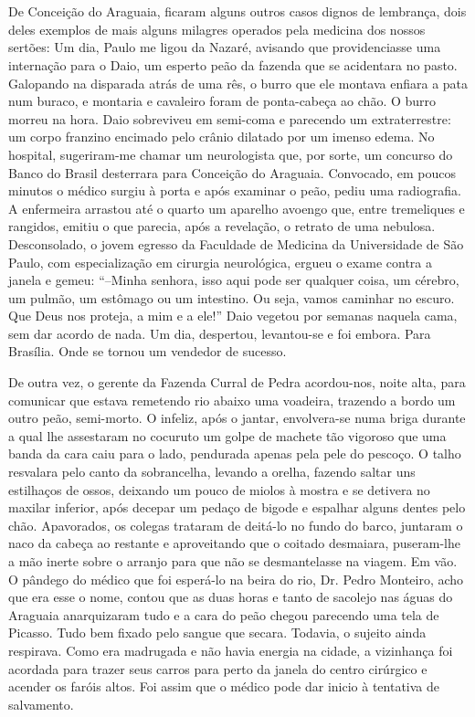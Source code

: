 \chapter{}
De Conceição do Araguaia, ficaram alguns outros casos dignos de lembrança, dois deles exemplos de mais alguns milagres operados pela medicina dos nossos sertões: 
Um dia, Paulo me ligou da Nazaré, avisando que providenciasse uma internação para o Daio, um esperto peão da fazenda que se acidentara no pasto.
Galopando na disparada atrás de uma rês, o burro que ele montava enfiara a pata num buraco, e montaria e cavaleiro foram de ponta-cabeça ao chão.
O burro morreu na hora.
Daio sobreviveu em semi-coma e parecendo um extraterrestre: um corpo franzino encimado pelo crânio dilatado por um imenso edema.
No hospital, sugeriram-me chamar um neurologista que, por sorte, um concurso do Banco do Brasil desterrara para Conceição do Araguaia.
Convocado, em poucos minutos o médico surgiu à porta e após examinar o peão, pediu uma radiografia.
A enfermeira arrastou até o quarto um aparelho avoengo que, entre tremeliques e rangidos, emitiu o que parecia, após a revelação, o retrato de uma nebulosa.
Desconsolado, o jovem egresso da Faculdade de Medicina da Universidade de São Paulo, com especialização em cirurgia neurológica, ergueu o exame contra a janela e gemeu:
``--Minha senhora, isso aqui pode ser qualquer coisa, um cérebro, um pulmão, um estômago ou um intestino.
Ou seja, vamos caminhar no escuro.
Que Deus nos proteja, a mim e a ele!'' 
Daio vegetou por semanas naquela cama, sem dar acordo de nada.
Um dia, despertou, levantou-se e foi embora.
Para Brasília.
Onde se tornou um vendedor de sucesso.

De outra vez, o gerente da Fazenda Curral de Pedra acordou-nos, noite alta, para comunicar que estava remetendo rio abaixo uma voadeira, trazendo a bordo um outro peão, semi-morto.
O infeliz, após o jantar, envolvera-se numa briga durante a qual lhe assestaram no cocuruto um golpe de machete tão vigoroso que uma banda da cara caiu para o lado, pendurada apenas pela pele do pescoço.
O talho resvalara pelo canto da sobrancelha, levando a orelha, fazendo saltar uns estilhaços de ossos, deixando um pouco de miolos à mostra e se detivera no maxilar inferior, após decepar um pedaço de bigode e espalhar alguns dentes pelo chão.
Apavorados, os colegas trataram de deitá-lo no fundo do barco, juntaram o naco da cabeça ao restante e aproveitando que o coitado desmaiara, puseram-lhe a mão inerte sobre o arranjo para que não se desmantelasse na viagem.
Em vão.
O pândego do médico que foi esperá-lo na beira do rio, Dr. Pedro Monteiro, acho que era esse o nome, contou que as duas horas e tanto de sacolejo nas águas  do Araguaia anarquizaram tudo e a cara do peão chegou parecendo uma tela de Picasso.
Tudo bem fixado pelo sangue que secara.
Todavia, o sujeito ainda respirava.
Como era madrugada e não havia energia na cidade, a vizinhança foi acordada para trazer seus carros para perto da janela do centro cirúrgico e acender os faróis altos.
Foi assim que o médico pode dar inicio à tentativa de salvamento.

